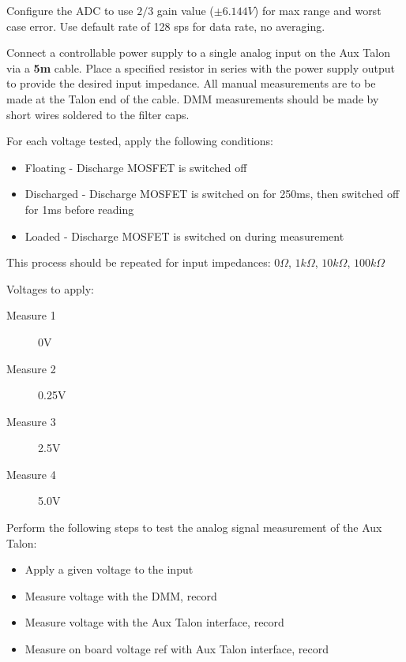 Configure the ADC to use $2/3$ gain value ($\pm 6.144V$) for max range and worst case error. Use default rate of 128 sps for data rate, no averaging. 

Connect a controllable power supply to a single analog input on the Aux Talon via a \textbf{5m} cable. Place a specified resistor in series with the power supply output to provide the desired input impedance. All manual measurements are to be made at the Talon end of the cable. DMM measurements should be made by short wires soldered to the filter caps. 

For each voltage tested, apply the following conditions:
\begin{itemize}
\item Floating - Discharge MOSFET is switched off
\item Discharged - Discharge MOSFET is switched on for 250ms, then switched off for 1ms before reading
\item Loaded - Discharge MOSFET is switched on during measurement 
\end{itemize}

This process should be repeated for input impedances: $0\Omega$, $1k\Omega$, $10k\Omega$, $100k\Omega$

Voltages to apply:
\begin{description}
\item [Measure 1] 0V
\item [Measure 2] 0.25V
\item [Measure 3] 2.5V
\item [Measure 4] 5.0V
\end{description}

Perform the following steps to test the analog signal measurement of the Aux Talon:
\begin{itemize}
\item Apply a given voltage to the input
\item Measure voltage with the DMM, record 
\item Measure voltage with the Aux Talon interface, record 
\item Measure on board voltage ref with Aux Talon interface, record 

\end{itemize}

